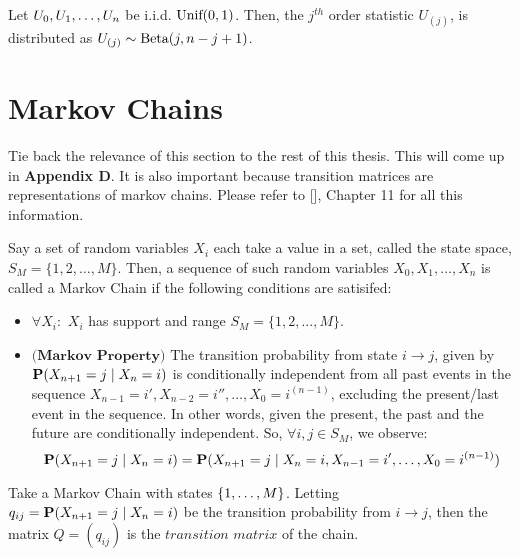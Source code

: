 \begin{theorem}
Let $\seq[n]{U}$ be i.i.d. $\Unif(0, 1)$. Then, the $j^{th}$ order statistic $U_{(j)}$, is distributed as $U_{(j)} \sim \Beta(j, n-j+1)$.
\end{theorem}

\newpage
\section{Markov Chains}


Tie back the relevance of this section to the rest of this thesis. This will come up in \textbf{Appendix D}. It is also important because transition matrices are representations of markov chains. Please refer to [\cite{blitz}], Chapter 11 for all this information.

\begin{definition} Say a set of random variables $X_i$ each take a value in a set, called the state space, $S_M = \{1,2,\dots,M\}$. Then, a sequence of such random variables $X_0,X_1,\dots,X_n$ is called a Markov Chain if the following conditions are satisifed:
\end{definition}

\begin{itemize}
\item $\forall X_i:$ $X_i$ has support and range $S_M = \{1,2,...,M\}$.
\item $\textbf{(Markov Property)}$ The transition probability from state $i \to j$, given by $\Prb(X_{n+1} = j \mid X_n = i)$ is conditionally independent from all past events in the sequence $X_{n-1} = i',X_{n-2} = i'', \dots,X_0 = i^{(n-1)}$, excluding the present/last event in the sequence. In other words, given the present, the past and the future are conditionally independent. So, $\forall i,j \in S_M$, we observe:
$$ \Prb(X_{n+1} = j \mid X_n = i) = \Prb(X_{n+1} = j \mid X_n = i, X_{n-1} = i', \dots,X_0 = i^{(n-1)})$$
\end{itemize}


\begin{definition}
Take a Markov Chain with states $\{\oneto[M]\}$. Letting $q_{ij} = \P(X_{n+1} = j \mid X_n = i)$ be the transition probability from $i \to j$, then the matrix $Q=(q_{ij})$ is the $\textit{transition matrix}$ of the chain.
\end{definition}

